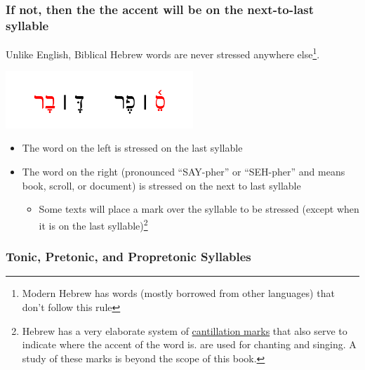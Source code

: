 \documentclass[
]{turabian-researchpaper}
\providecommand{\tightlist}{%
  \setlength{\itemsep}{0pt}\setlength{\parskip}{0pt}}
\begin{document}
\hypertarget{if-not-then-the-the-accent-will-be-on-the-next-to-last-syllable}{%
\subsubsection*{If not, then the the accent will be on the next-to-last syllable}\label{if-not-then-the-the-accent-will-be-on-the-next-to-last-syllable}}

Unlike English, Biblical Hebrew words are never stressed anywhere else\footnote{Modern Hebrew has words (mostly borrowed from other languages) that don't follow this rule}.

\begin{center}\includegraphics[width=200pt]{images/03.accent_stress} \end{center}

\begin{itemize}
\tightlist
\item
  The word on the left is stressed on the last syllable
\item
  The word on the right (pronounced ``SAY-pher'' or ``SEH-pher'' and means book, scroll, or document) is stressed on the next to last syllable

  \begin{itemize}
  \tightlist
  \item
    Some texts will place a mark over the syllable to be stressed (except when it is on the last syllable)\footnote{Hebrew has a very elaborate system of \href{https://en.wikipedia.org/wiki/Hebrew_cantillation}{cantillation marks} that also serve to indicate where the accent of the word is. are used for chanting and singing. A study of these marks is beyond the scope of this book.}
  \end{itemize}
\end{itemize}

\hypertarget{tonic-pretonic-and-propretonic-syllables}{%
\subsubsection*{Tonic, Pretonic, and Propretonic Syllables}\label{tonic-pretonic-and-propretonic-syllables}}
\end{document}
